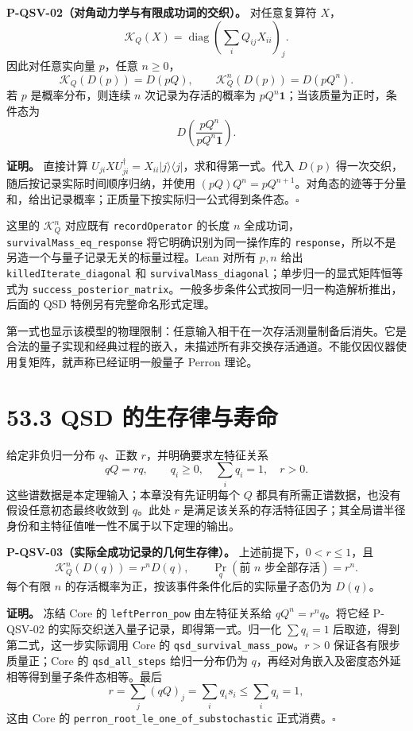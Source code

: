 \documentclass[
  11pt,
  oneside]{book}
\begin{document}
\textbf{P-QSV-02（对角动力学与有限成功词的交织）。} 对任意复算符 \(X\)，
\[
\mathcal K_Q(X)=\operatorname{diag}\left(\sum_iQ_{ij}X_{ii}\right)_j.
\] 因此对任意实向量 \(p\)，任意 \(n\ge0\)， \[
\mathcal K_Q(D(p))=D(pQ),\qquad
\mathcal K_Q^n(D(p))=D(pQ^n).
\] 若 \(p\) 是概率分布，则连续 \(n\) 次记录为存活的概率为
\(pQ^n\mathbf1\)；当该质量为正时，条件态为 \[
D\left(\frac{pQ^n}{pQ^n\mathbf1}\right).
\]

\textbf{证明。} 直接计算
\(U_{ji}XU_{ji}^{\dagger}=X_{ii}|j\rangle\langle j|\)，求和得第一式。代入
\(D(p)\) 得一次交织，随后按记录实际时间顺序归纳，并使用
\((pQ)Q^n=pQ^{n+1}\)。对角态的迹等于分量和，给出记录概率；正质量下按实际归一公式得到条件态。\(\square\)

这里的 \(\mathcal K_Q^n\) 对应既有 \texttt{record\allowbreak Operator} 的长度 \(n\)
全成功词，\texttt{survival\allowbreak Mass\_\allowbreak eq\_\allowbreak response} 将它明确识别为同一操作库的
\texttt{response}，所以不是另造一个与量子记录无关的标量过程。Lean 对所有
\(p,n\) 给出 \texttt{killed\allowbreak Iterate\_\allowbreak diagonal} 和
\texttt{survival\allowbreak Mass\_\allowbreak diagonal}；单步归一的显式矩阵恒等式为
\texttt{success\_\allowbreak posterior\_\allowbreak matrix}。一般多步条件公式按同一归一构造解析推出，后面的
QSD 特例另有完整命名形式定理。

第一式也显示该模型的物理限制：任意输入相干在一次存活测量制备后消失。它是合法的量子实现和经典过程的嵌入，未描述所有非交换存活通道。不能仅因仪器使用复矩阵，就声称已经证明一般量子
Perron 理论。

\section{53.3 QSD 的生存律与寿命}

给定非负归一分布 \(q\)、正数 \(r\)，并明确要求左特征关系 \[
qQ=rq,\qquad q_i\ge0,\quad \sum_iq_i=1,\quad r>0.
\] 这些谱数据是本定理输入；本章没有先证明每个 \(Q\)
都具有所需正谱数据，也没有假设任意初态最终收敛到 \(q\)。此处 \(r\)
是满足该关系的存活特征因子；其全局谱半径身份和主特征值唯一性不属于以下定理的输出。

\protect\hypertarget{p-qsv-03}{}{}

\textbf{P-QSV-03（实际全成功记录的几何生存律）。}
上述前提下，\(0<r\le1\)，且 \[
\mathcal K_Q^n(D(q))=r^nD(q),\qquad
\Pr_q(\text{前 }n\text{ 步全部存活})=r^n.
\] 每个有限 \(n\) 的存活概率为正，按该事件条件化后的实际量子态仍为
\(D(q)\)。

\textbf{证明。} 冻结 Core 的 \texttt{left\allowbreak Perron\_\allowbreak pow} 由左特征关系给
\(qQ^n=r^nq\)。将它经 P-QSV-02
的实际交织送入量子记录，即得第一式。归一化 \(\sum q_i=1\)
后取迹，得到第二式，这一步实际调用 Core 的
\texttt{qsd\_\allowbreak survival\_\allowbreak mass\_\allowbreak pow}。\(r>0\) 保证各有限步质量正；Core 的
\texttt{qsd\_\allowbreak all\_\allowbreak steps} 给归一分布仍为
\(q\)，再经对角嵌入及密度态外延相等得到量子条件态相等。最后 \[
r=\sum_j(qQ)_j=\sum_iq_is_i\le\sum_iq_i=1,
\] 这由 Core 的 \texttt{perron\_\allowbreak root\_\allowbreak le\_\allowbreak one\_\allowbreak of\_\allowbreak substochastic}
正式消费。\(\square\)
\end{document}
